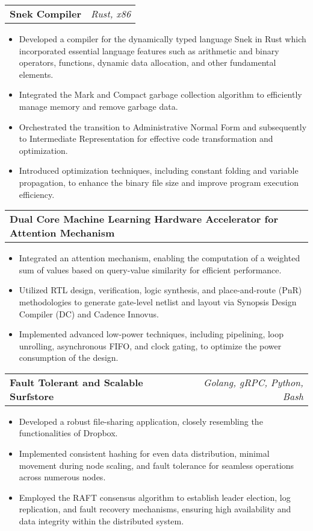 \documentclass[letterpaper,11pt]{article}
\makeatletter
\newcommand{\resumeItem}[1]{
  \item\small{
    {#1 \vspace{-2pt}}
  }
}
\newcommand{\resumeProjectHeading}[2]{
    \vspace{-2pt}\item
    \begin{tabular*}{0.97\textwidth}{l@{\extracolsep{\fill}}r}
      \textcolor{secondary_color}{\textbf{#1}} & \textcolor{secondary_color}{\textit{\small #2}} \\
    \end{tabular*}\vspace{-7pt}
}
\newcommand{\resumeItemListStart}{\begin{itemize}}
\newcommand{\resumeItemListEnd}{\end{itemize}\vspace{-5pt}}
\makeatother
\begin{document}
      \resumeProjectHeading
        {\textbf{Snek Compiler}}{Rust, x86}
          \resumeItemListStart
            \resumeItem{Developed a compiler for the dynamically typed language Snek in Rust which incorporated essential language features such as arithmetic and binary operators, functions, dynamic data allocation, and other fundamental elements.}
            \resumeItem{Integrated the Mark and Compact garbage collection algorithm to efficiently manage memory and remove garbage data.}
            \resumeItem{Orchestrated the transition to Administrative Normal Form and subsequently to Intermediate Representation for effective code transformation and optimization.}
            \resumeItem{Introduced optimization techniques, including constant folding and variable propagation, to enhance the binary file size and improve program execution efficiency.}
          \resumeItemListEnd
      
      \resumeProjectHeading
        {\textbf{Dual Core Machine Learning Hardware Accelerator for Attention Mechanism}}{}
          \resumeItemListStart
            \resumeItem{Integrated an attention mechanism, enabling the computation of a weighted sum of values based on query-value similarity for efficient performance.}
            \resumeItem{Utilized RTL design, verification, logic synthesis, and place-and-route (PnR) methodologies to generate gate-level netlist and layout via Synopsis Design Compiler (DC) and Cadence Innovus.}
            \resumeItem{Implemented advanced low-power techniques, including pipelining, loop unrolling, asynchronous FIFO, and clock gating, to optimize the power consumption of the design.}
          \resumeItemListEnd
      
      \resumeProjectHeading
        {\textbf{Fault Tolerant and Scalable Surfstore}}{Golang, gRPC, Python, Bash}
          \resumeItemListStart
            \resumeItem{Developed a robust file-sharing application, closely resembling the functionalities of Dropbox.}
            \resumeItem{Implemented consistent hashing for even data distribution, minimal movement during node scaling, and fault tolerance for seamless operations across numerous nodes.}
            \resumeItem{Employed the RAFT consensus algorithm to establish leader election, log replication, and fault recovery mechanisms, ensuring high availability and data integrity within the distributed system.}
          \resumeItemListEnd
\end{document}
